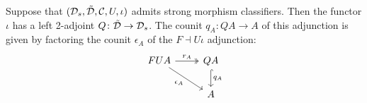 \documentclass[11pt,oneside,article]{memoir}
\begin{document}
\begin{theorem}\label{thm:strong_classifier}
   Suppose that $(\mathcal{D}_s,\tilde{\mathcal{D}},\mathcal{C},U,\iota)$ admits strong morphism classifiers. Then the
   functor $\iota$ has a left 2-adjoint $Q\colon\tilde{\mathcal{D}}\to\mathcal{D}_s$. The counit $q_A\colon QA\to A$
   of this adjunction is given by factoring the counit $\epsilon_A$ of the $F\dashv U\iota$
   adjunction:
   \begin{equation}\label{eqn:factorization_counit}
      \begin{tikzcd}
         FUA \ar[r,two heads,"r_A"] \ar[dr,"\epsilon_A"']
            & QA \ar[d,hook,"q_A"] \\
         & A
      \end{tikzcd}
   \end{equation}
\end{theorem}
\end{document}
